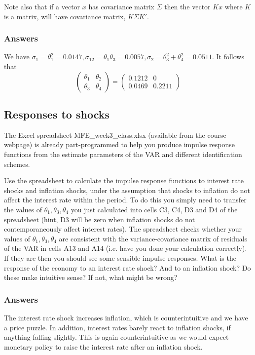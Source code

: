 \documentclass[authoryear,11pt]{elsarticle}
\begin{document}
Note also that if a vector $x$ has covariance matrix $\Sigma$ then the vector $Kx$ where $K$ is a matrix, will have covariance matrix, $K \Sigma K'$.

\subsubsection*{Answers}
We have $\sigma _{1}=\theta_{1}^{2}=0.0147,\sigma _{12}=\theta _{1}\theta _{3}=0.0057,\sigma_{2}=\theta _{3}^{2}+\theta _{4}^{2}=0.0511$. It follows that
\[
\left( 
\begin{array}{cc}
\theta _{1} & \theta _{2} \\ 
\theta _{3} & \theta _{4}
\end{array}
\right) =\left( 
\begin{array}{cc}
0.1212 & 0 \\ 
0.0469 & 0.2211
\end{array}
\right) 
\]

\subsection{Responses to shocks}
The Excel spreadsheet MFE\_week3\_class.xlsx (available from the course webpage) is already part-programmed to help you produce impulse response functions from the estimate parameters of the VAR and different identification schemes.

Use the spreadsheet to calculate the impulse response functions to interest rate shocks and inflation shocks, under the assumption that shocks
to inflation do not affect the interest rate within the period. To do this you simply need to transfer the values of $\theta _{1},\theta _{3},\theta_{4}$ you just calculated into cells C3, C4, D3 and D4 of the spreadsheet (hint, D3 will be zero when inflation shocks do not contemporaneously affect interest rates). The spreadsheet checks whether your values of $\theta _{1},\theta _{3},\theta _{4}$ are consistent with the variance-covariance matrix of residuals of the VAR in cells A13 and A14 (i.e. have you done your calculation correctly). If they are then you should see some sensible impulse responses. What is the response of the economy to an interest rate shock? And to an inflation shock? Do these make intuitive sense? If not, what might be wrong?

\subsubsection*{Answers}
The interest rate shock increases inflation, which is counterintuitive and we have a price puzzle. In addition, interest rates barely react to inflation shocks, if anything falling slightly. This is again counterintuitive as we would expect monetary policy to raise the interest rate after an inflation shock.
\end{document}
